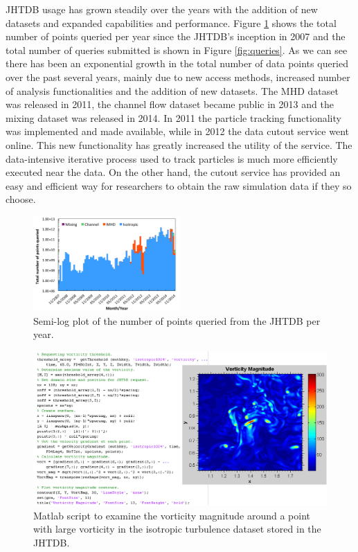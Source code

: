 \documentclass[10pt,twocolumn]{article}
\begin{document}
JHTDB usage has grown steadily over the years with the addition of new datasets and expanded capabilities and performance. Figure \ref{fig:points_queried}
shows the total number of points queried per year since the JHTDB's inception in 2007 and the total number of queries submitted is shown in Figure
\ref{fig:queries}. As we can see there has been an exponential growth in the total number of data points queried over the past several years, mainly due to
new access methods, increased number of analysis functionalities and the addition of new datasets. 
The MHD dataset was released in 2011, the channel flow dataset
became public in 2013 and the mixing dataset was released in 2014. In 2011 the particle tracking functionality was implemented and made available, while
in 2012 the data cutout service went online. This new functionality has greatly increased the utility of the service. The data-intensive iterative process used to
track particles is much more efficiently executed near the data. On the other hand, the cutout service has provided an easy and efficient way for researchers to
obtain the raw simulation data if they so choose. 

\begin{figure}
\includegraphics[width=0.5\textwidth]{jhtdb_usage.pdf}
\caption{Semi-log plot of the number of points queried from the JHTDB per year.}
\label{fig:points_queried}
\end{figure}

\begin{figure}
\includegraphics[width=1.0\textwidth]{vorticity.png}
\caption{Matlab script to examine the vorticity magnitude around a point with large vorticity in the isotropic turbulence dataset stored in the JHTDB.}
\label{fig:vorticity}
\end{figure}
\end{document}
